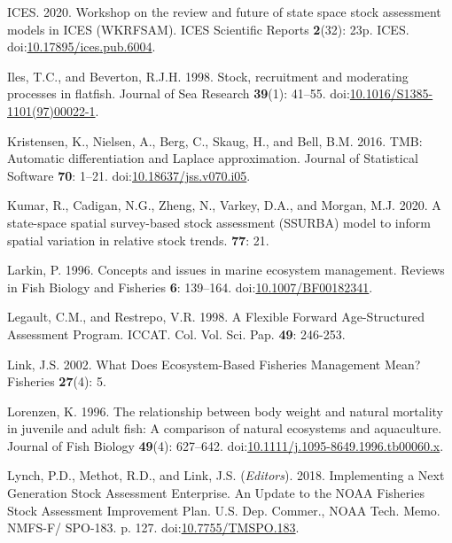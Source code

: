 \documentclass[]{article}
\begin{document}
\leavevmode\hypertarget{ref-ices2020Workshop}{}%
ICES. 2020. Workshop on the review and future of state space stock
assessment models in ICES (WKRFSAM). ICES Scientific Reports
\textbf{2}(32): 23p. ICES.
doi:\href{https://doi.org/10.17895/ices.pub.6004}{10.17895/ices.pub.6004}.

\leavevmode\hypertarget{ref-iles1998Stock}{}%
Iles, T.C., and Beverton, R.J.H. 1998. Stock, recruitment and moderating
processes in flatfish. Journal of Sea Research \textbf{39}(1): 41--55.
doi:\href{https://doi.org/10.1016/S1385-1101(97)00022-1}{10.1016/S1385-1101(97)00022-1}.

\leavevmode\hypertarget{ref-kristensen2016TMB}{}%
Kristensen, K., Nielsen, A., Berg, C., Skaug, H., and Bell, B.M. 2016.
TMB: Automatic differentiation and Laplace approximation. Journal of
Statistical Software \textbf{70}: 1--21.
doi:\href{https://doi.org/10.18637/jss.v070.i05}{10.18637/jss.v070.i05}.

\leavevmode\hypertarget{ref-kumar2020Statespace}{}%
Kumar, R., Cadigan, N.G., Zheng, N., Varkey, D.A., and Morgan, M.J.
2020. A state-space spatial survey-based stock assessment (SSURBA) model
to inform spatial variation in relative stock trends. \textbf{77}: 21.

\leavevmode\hypertarget{ref-larkin1996Concepts}{}%
Larkin, P. 1996. Concepts and issues in marine ecosystem management.
Reviews in Fish Biology and Fisheries \textbf{6}: 139--164.
doi:\href{https://doi.org/10.1007/BF00182341}{10.1007/BF00182341}.

\leavevmode\hypertarget{ref-legault1998Flexible}{}%
Legault, C.M., and Restrepo, V.R. 1998. A Flexible Forward
Age-Structured Assessment Program. ICCAT. Col. Vol. Sci. Pap. \textbf{49}: 246-253.

\leavevmode\hypertarget{ref-link2002What}{}%
Link, J.S. 2002. What Does Ecosystem-Based Fisheries Management Mean?
Fisheries \textbf{27}(4): 5.

\leavevmode\hypertarget{ref-lorenzen1996Relationship}{}%
Lorenzen, K. 1996. The relationship between body weight and natural
mortality in juvenile and adult fish: A comparison of natural ecosystems
and aquaculture. Journal of Fish Biology \textbf{49}(4): 627--642.
doi:\href{https://doi.org/10.1111/j.1095-8649.1996.tb00060.x}{10.1111/j.1095-8649.1996.tb00060.x}.

\leavevmode\hypertarget{ref-lynch2018Implementing}{}%
Lynch, P.D., Methot, R.D., and Link, J.S. (\emph{Editors}). 2018.
Implementing a Next Generation Stock Assessment Enterprise. An Update to
the NOAA Fisheries Stock Assessment Improvement Plan. U.S. Dep. Commer.,
NOAA Tech. Memo. NMFS-F/ SPO-183. p. 127.
doi:\href{https://doi.org/10.7755/TMSPO.183}{10.7755/TMSPO.183}.
\end{document}
